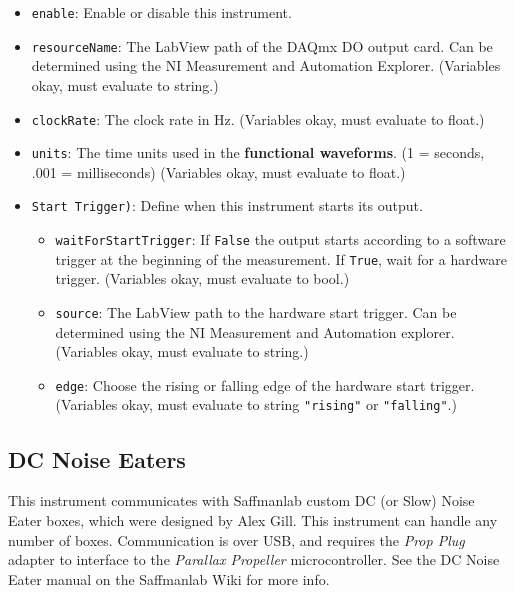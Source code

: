 \documentclass[pdftex,11pt,letterpaper]{article}
\begin{document}
\begin{itemize}
\item \texttt{enable}:  Enable or disable this instrument.
\item \texttt{resourceName}:  The LabView path of the DAQmx DO output card.  Can be determined using the NI Measurement and Automation Explorer. (Variables okay, must evaluate to string.)
\item \texttt{clockRate}:  The clock rate in Hz.  (Variables okay, must evaluate to float.)
\item \texttt{units}:  The time units used in the \textbf{functional waveforms}.  (1 = seconds, .001 = milliseconds)  (Variables okay, must evaluate to float.)
\item \texttt{Start Trigger)}:  Define when this instrument starts its output.
\begin{itemize}
\item \texttt{waitForStartTrigger}:  If \texttt{False} the output starts according to a software trigger at the beginning of the measurement.  If \texttt{True}, wait for a hardware trigger.  (Variables okay, must evaluate to bool.)
\item \texttt{source}:  The LabView path to the hardware start trigger.  Can be determined using the NI Measurement and Automation explorer. (Variables okay, must evaluate to string.)
\item \texttt{edge}: Choose the rising or falling edge of the hardware start trigger.  (Variables okay, must evaluate to string \texttt{"rising"} or \texttt{"falling"}.)
\end{itemize}
\end{itemize}

\subsection{DC Noise Eaters}

This instrument communicates with Saffmanlab custom DC (or Slow) Noise Eater boxes, which were designed by Alex Gill.  This instrument can handle any number of boxes.  Communication is over USB, and requires the \textit{Prop Plug} adapter to interface to the \textit{Parallax Propeller} microcontroller.  See the DC Noise Eater manual on the Saffmanlab Wiki for more info.
\end{document}
